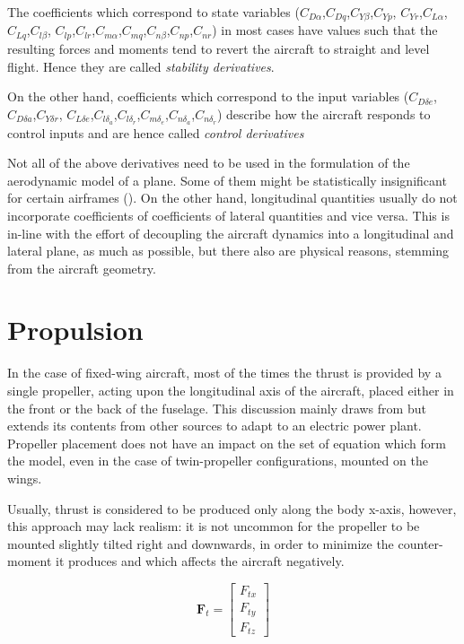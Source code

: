 The coefficients which correspond to state variables ($C_{D\alpha}$,$C_{Dq}$,$C_{Y\beta}$,$ C_{Yp}$, $C_{Yr}$,$C_{L\alpha}$,$C_{Lq}$,$C_{l\beta}$,
$C_{lp}$,$C_{lr}$,$C_{m\alpha}$,$C_{mq}$,$C_{n\beta}$,$C_{np}$,$C_{nr}$) in most cases have values such that the resulting forces and moments tend to revert the aircraft to straight and level flight. Hence they are called \emph{stability derivatives}.

On the other hand, coefficients which correspond to the input variables ($C_{D\delta e}$,$C_{D\delta a}$,$ C_{Y\delta r}$,
$C_{L\delta e}$,$C_{l\delta_a}$,$C_{l\delta_r}$,$C_{m\delta_e}$,$C_{n\delta_a}$,$C_{n \delta_r}$) describe how the aircraft responds to control inputs and are hence called \emph{control derivatives}

Not all of the above derivatives need to be used in the formulation of the aerodynamic model of a plane. Some of them might be statistically insignificant for certain airframes (\cite{Klein2006}). On the other hand, longitudinal quantities usually do not incorporate coefficients of coefficients of lateral quantities and vice versa. This is in-line with the effort of decoupling the aircraft dynamics into a longitudinal and lateral plane, as much as possible, but there also are physical reasons, stemming from the aircraft geometry.


\section{Propulsion}

In the case of fixed-wing aircraft, most of the times the thrust is provided by a single propeller, acting upon the longitudinal axis of the aircraft, placed either in the front or the back of the fuselage. This discussion mainly draws from \cite[p.~127]{Allerton2009} but extends its contents from other sources to adapt to an electric power plant.
Propeller placement does not have an impact on the set of equation which form the model, even in the case of twin-propeller configurations, mounted on the wings.

Usually, thrust is considered to be produced only along the body x-axis, however, this approach may lack realism: it is not uncommon for the propeller to be mounted slightly tilted right and downwards, in order to minimize the counter-moment it produces and which affects the aircraft negatively.

\begin{equation} \label{eq:thrustForce}
	\bm{F}_t = \begin{bmatrix}
		F_{tx} \\ F_{ty} \\ F_{tz}
	\end{bmatrix}
\end{equation}

